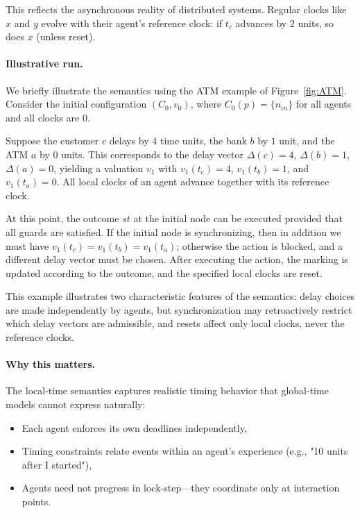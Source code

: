 This reflects the asynchronous reality of distributed systems. Regular clocks like $x$ and $y$ evolve with their agent's reference clock: if $t_c$ advances by 2 units, so does $x$ (unless reset).

\paragraph{Illustrative run.}
We briefly illustrate the semantics using the ATM example of
Figure~\ref{fig:ATM}.  Consider the initial configuration $(C_0,v_0)$, where
$C_0(p)=\{n_{in}\}$ for all agents and all clocks are $0$.

Suppose the customer $c$ delays by $4$ time units, the bank $b$ by $1$ unit, and
the ATM $a$ by $0$ units.  This corresponds to the delay vector
$\Delta(c)=4$, $\Delta(b)=1$, $\Delta(a)=0$, yielding a valuation $v_1$ with
$v_1(t_c)=4$, $v_1(t_b)=1$, and $v_1(t_a)=0$.  All local clocks of an agent advance
together with its reference clock.

At this point, the outcome $st$ at the initial node can be executed provided that
all guards are satisfied.  If the initial node is synchronizing, then in addition
we must have $v_1(t_c)=v_1(t_b)=v_1(t_a)$; otherwise the action is blocked, and a
different delay vector must be chosen.  After executing the action, the marking
is updated according to the outcome, and the specified local clocks are reset.

This example illustrates two characteristic features of the semantics: delay
choices are made independently by agents, but synchronization may retroactively
restrict which delay vectors are admissible, and resets affect only local clocks,
never the reference clocks.

\paragraph{Why this matters.} The local-time semantics captures realistic timing behavior that global-time models cannot express naturally:
\begin{itemize}
\item Each agent enforces its own deadlines independently,
\item Timing constraints relate events within an agent's experience (e.g., "10 units after I started"),
\item Agents need not progress in lock-step—they coordinate only at interaction points.
\end{itemize}

